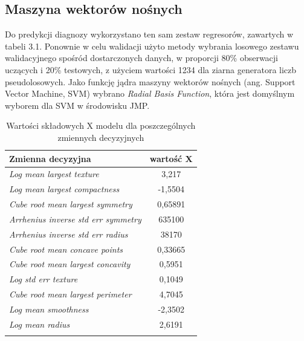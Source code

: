 \newpage
\subsection{Maszyna wektorów nośnych}

Do predykcji diagnozy wykorzystano ten sam zestaw regresorów, zawartych w tabeli 3.1. Ponownie w celu walidacji użyto metody wybrania losowego zestawu walidacyjnego spośród dostarczonych danych, w proporcji 80\% obserwacji uczących i 20\% testowych, z użyciem wartości 1234 dla ziarna generatora liczb pseudolosowych. Jako funkcję jądra maszyny wektorów nośnych (ang. Support Vector Machine, SVM) wybrano \textit{Radial Basis Function}, która jest domyślnym wyborem dla SVM w środowisku JMP. 

\begin{longtable}{l | c}
	\centering
	Zmienna decyzyjna & wartość X \\
	\hline
	\textit{Log mean largest texture} & 3,217 \\
	\textit{Log mean largest compactness} & -1,5504 \\
	\textit{Cube root mean largest symmetry} & 0,65891 \\
	\textit{Arrhenius inverse std err symmetry} & 635100 \\
	\textit{Arrhenius inverse std err radius} & 38170 \\
	\textit{Cube root mean concave points} & 0,33665 \\
	\textit{Cube root mean largest concavity} & 0,5951 \\
	\textit{Log std err texture} & 0,1049 \\
	\textit{Cube root mean largest perimeter} & 4,7045 \\
	\textit{Log mean smoothness} & -2,3502 \\
	\textit{Log mean radius} & 2,6191 \\
	\caption{Wartości składowych X modelu dla poszczególnych zmiennych decyzyjnych}
	\label{svm:1}
\end{longtable} 

